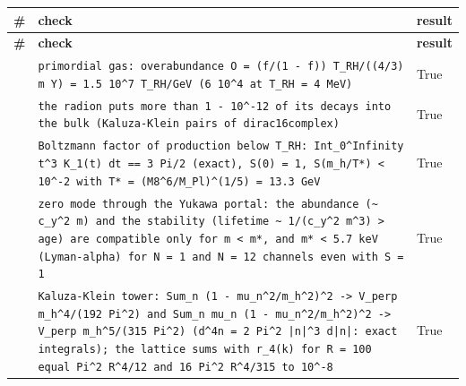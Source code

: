 \documentclass[10pt,a4paper]{article}
\begin{document}
{\footnotesize
\begin{longtable}{>{\raggedright\arraybackslash}p{}>{\raggedright\arraybackslash}p{}>{\raggedright\arraybackslash}p{}}
\toprule
\textbf{\#} & \textbf{check} & \textbf{result} \\
\midrule\endfirsthead
\toprule
\textbf{\#} & \textbf{check} & \textbf{result} \\
\midrule\endhead
\endfoot
\bottomrule\endlastfoot
409 & \texttt{primordial gas: overabundance O = (f/\allowbreak{}(1 - f)) T\_\allowbreak{}RH/\allowbreak{}((4/\allowbreak{}3) m Y) = 1.5 10\textasciicircum{}7 T\_\allowbreak{}RH/\allowbreak{}GeV (6 10\textasciicircum{}4 at T\_\allowbreak{}RH = 4 MeV)} & True \\
410 & \texttt{the radion puts more than 1 - 10\textasciicircum{}-12 of its decays into the bulk (Kaluza-Klein pairs of dirac16complex)} & True \\
411 & \texttt{Boltzmann factor of production below T\_\allowbreak{}RH: Int\_\allowbreak{}0\textasciicircum{}Infinity t\textasciicircum{}3 K\_\allowbreak{}1(t) dt == 3 Pi/\allowbreak{}2 (exact), S(0) = 1, S(m\_\allowbreak{}h/\allowbreak{}T*) < 10\textasciicircum{}-2 with T* = (M8\textasciicircum{}6/\allowbreak{}M\_\allowbreak{}Pl)\textasciicircum{}(1/\allowbreak{}5) = 13.3 GeV} & True \\
412 & \texttt{zero mode through the Yukawa portal: the abundance (\textasciitilde{} c\_\allowbreak{}y\textasciicircum{}2 m) and the stability (lifetime \textasciitilde{} 1/\allowbreak{}(c\_\allowbreak{}y\textasciicircum{}2 m\textasciicircum{}3) > age) are compatible only for m < m*, and m* < 5.7 keV (Lyman-alpha) for N = 1 and N = 12 channels even with S = 1} & True \\
413 & \texttt{Kaluza-Klein tower: Sum\_\allowbreak{}n (1 - mu\_\allowbreak{}n\textasciicircum{}2/\allowbreak{}m\_\allowbreak{}h\textasciicircum{}2)\textasciicircum{}2 -> V\_\allowbreak{}perp m\_\allowbreak{}h\textasciicircum{}4/\allowbreak{}(192 Pi\textasciicircum{}2) and Sum\_\allowbreak{}n mu\_\allowbreak{}n (1 - mu\_\allowbreak{}n\textasciicircum{}2/\allowbreak{}m\_\allowbreak{}h\textasciicircum{}2)\textasciicircum{}2 -> V\_\allowbreak{}perp m\_\allowbreak{}h\textasciicircum{}5/\allowbreak{}(315 Pi\textasciicircum{}2) (d\textasciicircum{}4n = 2 Pi\textasciicircum{}2 |n|\textasciicircum{}3 d|n|: exact integrals); the lattice sums with r\_\allowbreak{}4(k) for R = 100 equal Pi\textasciicircum{}2 R\textasciicircum{}4/\allowbreak{}12 and 16 Pi\textasciicircum{}2 R\textasciicircum{}4/\allowbreak{}315 to 10\textasciicircum{}-8} & True \\

\end{longtable}}
\end{document}
